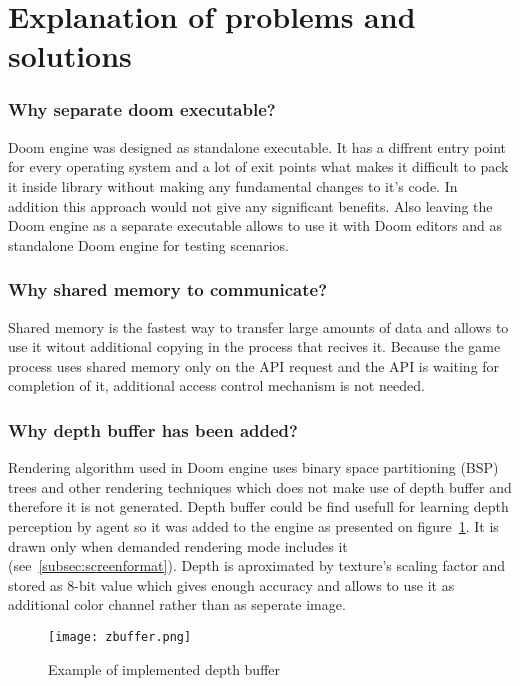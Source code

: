 \section{Explanation of problems and solutions}\label{sec:architecture_solutions}

\subsubsection{Why separate doom executable?}

Doom engine was designed as standalone executable. It has a diffrent entry point for every operating system and a lot of exit points what makes it difficult to pack it inside library without making any fundamental changes to it's code. In addition this approach would not give any significant benefits. Also leaving the Doom engine as a separate executable allows to use it with Doom editors and as standalone Doom engine for testing scenarios.

\subsubsection{Why shared memory to communicate?}

Shared memory is the fastest way to transfer large amounts of data and allows to use it witout additional copying in the process that recives it. 
Because the game process uses shared memory only on the API request and the API is waiting for completion of it, additional access control mechanism is not needed.

\subsubsection{Why depth buffer has been added?}

Rendering algorithm used in Doom engine uses binary space partitioning (BSP) trees and other rendering techniques which does not make use of depth buffer and therefore it is not generated.
Depth buffer could be find usefull for learning depth perception by agent so it was added to the engine as presented on figure~\ref{fig:zbuffer}.
It is drawn only when demanded rendering mode includes it (see~\ref{subsec:screenformat}).
Depth is aproximated by texture's scaling factor and stored as 8-bit value which gives enough accuracy and allows to use it as additional color channel rather than as seperate image.

\begin{figure}
\centering
\texttt{[image: zbuffer.png]}
\caption{Example of implemented depth buffer}
\label{fig:zbuffer}
\end{figure}

